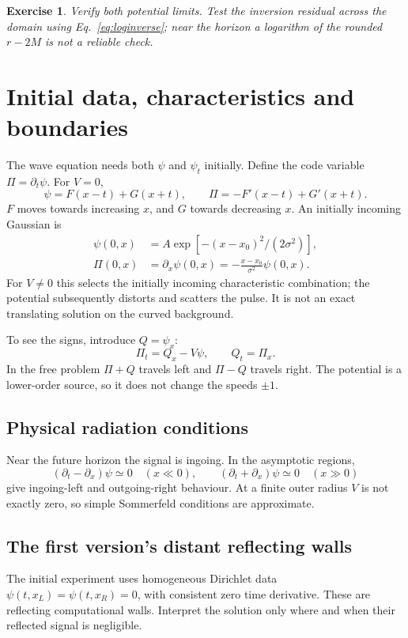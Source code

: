 \documentclass[11pt,a4paper]{article}
\numberwithin{equation}{section}
\newtheorem{exercise}{Exercise}[section]
\newcommand{\pd}{\partial}
\begin{document}
\begin{exercise}
Verify both potential limits. Test the inversion residual across the
domain using Eq.~\eqref{eq:loginverse}; near the horizon a logarithm of
the rounded $r-2M$ is not a reliable check.
\end{exercise}

\section{Initial data, characteristics and boundaries}\label{sec:initial}

The wave equation needs both $\psi$ and $\psi_t$ initially. Define the code
variable $\Pi=\pd_t\psi$. For $V=0$,
\begin{equation}
 \psi=F(x-t)+G(x+t),\qquad
 \Pi=-F'(x-t)+G'(x+t).
\end{equation}
$F$ moves towards increasing $x$, and $G$ towards decreasing $x$.
An initially incoming Gaussian is
\begin{align}\label{eq:gaussian}
 \psi(0,x)&=A\exp[-(x-x_0)^2/(2\sigma^2)],\\
 \Pi(0,x)&=\pd_x\psi(0,x)=-\frac{x-x_0}{\sigma^2}\psi(0,x).
\end{align}
For $V\ne0$ this selects the initially incoming characteristic combination;
the potential subsequently distorts and scatters the pulse. It is not an
exact translating solution on the curved background.

To see the signs, introduce $Q=\psi_x$:
\begin{equation}
 \Pi_t=Q_x-V\psi,\qquad Q_t=\Pi_x.
\end{equation}
In the free problem $\Pi+Q$ travels left and $\Pi-Q$ travels right.
The potential is a lower-order source, so it does not change the speeds
$\pm1$.

\subsection{Physical radiation conditions}
Near the future horizon the signal is ingoing. In the asymptotic regions,
\begin{equation}\label{eq:physicalbc}
 (\pd_t-\pd_x)\psi\simeq0\quad(x\ll0),\qquad
 (\pd_t+\pd_x)\psi\simeq0\quad(x\gg0)
\end{equation}
give ingoing-left and outgoing-right behaviour. At a finite outer radius
$V$ is not exactly zero, so simple Sommerfeld conditions are approximate.

\subsection{The first version's distant reflecting walls}
The initial experiment uses homogeneous Dirichlet data
$\psi(t,x_L)=\psi(t,x_R)=0$, with consistent zero time derivative.
These are reflecting computational walls. Interpret the solution only where
and when their reflected signal is negligible.
\end{document}
